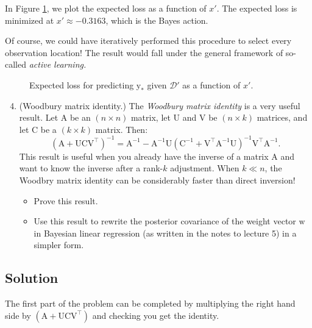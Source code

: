 \documentclass{article}
\newcommand{\mc}[1]{\mathcal{#1}}
\newcommand{\data}{\mc{D}}
\newcommand{\mat}[1]{\bm{\mathrm{#1}}}
\renewcommand{\vec}[1]{\bm{\mathrm{#1}}}
\newcommand{\trans}{^\top}
\newcommand{\inv}{^{-1}}
\begin{document}
In Figure \ref{problem_3}, we plot the expected loss as a function of
$x'$.  The expected loss is minimized at $x' \approx -0.3163$, which
is the Bayes action.

Of course, we could have iteratively performed this procedure to
select every observation location!  The result would fall under the
general framework of so-called \emph{active learning.}

\begin{figure}
  \centering
  
  \caption{Expected loss for predicting $\vec{y}_\ast$ given $\data'$
    as a function of $x'$.}
  \label{problem_3}
\end{figure}

\clearpage
\begin{enumerate}
\setcounter{enumi}{3}
\item
  (Woodbury matrix identity.)
  The \emph{Woodbury matrix identity} is a very useful result.  Let
  $\mat{A}$ be an $(n \times n)$ matrix, let $\mat{U}$ and $\mat{V}$
  be $(n \times k)$ matrices, and let $\mat{C}$ be a $(k \times k)$
  matrix.  Then:
  \begin{equation*}
    (\mat{A} + \mat{U}\mat{C}\mat{V}\trans)\inv
    =
    \mat{A}\inv
    -
    \mat{A}\inv
    \mat{U}
    (\mat{C}\inv + \mat{V}\trans \mat{A}\inv \mat{U})\inv
    \mat{V}\trans
    \mat{A}\inv.
  \end{equation*}
  This result is useful when you already have the inverse of a matrix
  $\mat{A}$ and want to know the inverse after a rank-$k$ adjustment.
  When $k \ll n$, the Woodbry matrix identity can be considerably
  faster than direct inversion!
  \begin{itemize}
  \item
    Prove this result.
  \item
    Use this result to rewrite the posterior covariance of the weight
    vector $\vec{w}$ in Bayesian linear regression (as written in the
    notes to lecture 5) in a simpler form.
  \end{itemize}
\end{enumerate}

\subsection*{Solution}

The first part of the problem can be completed by multiplying the
right hand side by $(\mat{A} + \mat{U}\mat{C}\mat{V}\trans)$ and
checking you get the identity.
\end{document}
